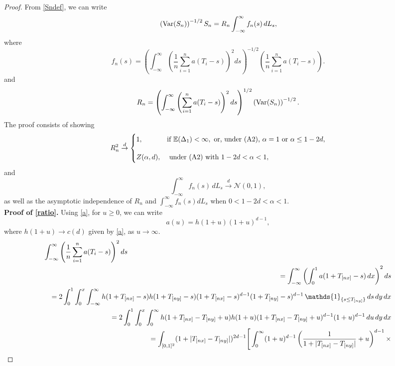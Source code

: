 \documentclass[preprint,12pt]{article}
\newcommand{\ind}[1]{\,\mathds{1}_{\{#1\}}}
\newcommand{\Var}{{\rm Var}}
\begin{document}
\begin{proof} From \eqref{Sndef}, we can write
\begin{eqnarray*}
\left(\Var(S_n)\right)^{-1/2}S_n
=
R_n
\int_{-\infty}^\infty f_n(s)\,dL_s,
\end{eqnarray*}
where
\begin{equation}\label{normalized f_n}
f_n(s)
=
\left(
\int_{-\infty}^\infty
\left(
\frac{1}{n}\sum_{i=1}^n a(T_i-s)
\right)^2ds
\right)^{-1/2}
\left(
\frac{1}{n}\sum_{i=1}^n a(T_i-s)
\right).
\end{equation}
and
$$
R_n
=
\left(
\int_{-\infty}^\infty
\left(\sum_{i=1}^n a(T_i-s)\right)^2ds
\right)^{1/2}
\left(\Var(S_n)\right)^{-1/2}.
$$
The proof consists of showing 
\begin{eqnarray}\label{ratio}
R_n^2\overset{d}{\to}
\begin{cases}
1,
&
\textrm{if } \mathbb{E}(\Delta_1)<\infty,
\textrm{ or, under {\rm(A2)}, } \alpha=1
\textrm{ or } \alpha\le 1-2d,
\\[0.4cm]
Z(\alpha,d),
&
\textrm{ under {\rm(A2)} with } 1-2d<\alpha<1,
\end{cases}
\end{eqnarray}
and
\begin{equation}\label{self normalized}
\int_{-\infty}^\infty f_n(s)\,dL_s
\overset{d}{\longrightarrow}
\mathcal{N}(0,1),
\end{equation}
as well as  the asymptotic independence of 
$R_n$ and $\int_{-\infty}^\infty f_n(s)dL_s$  when $0<1-2d<\alpha<1$.\\
{\bf Proof of \eqref{ratio}.}
Using \eqref{a}, for $u\ge0$,  we can write
$$
a(u)=h(1+u)(1+u)^{d-1},
$$
where $h(1+u)\to c(d)$ given by \eqref{a}, as $u\to\infty$.
\begin{eqnarray}\label{equivalence}
\lefteqn{
\int_{-\infty}^\infty
\left(
\frac{1}{n}\sum_{i=1}^n a(T_i-s)
\right)^2ds
}\nonumber\\
&&=
\int_{-\infty}^\infty
\left(
\int_0^1
a(1+T_{[nx]}-s)\,dx
\right)^2ds
\nonumber\\
&&=
2\int_0^1\int_0^x\int_{-\infty}^\infty
h(1+T_{[nx]}-s)h(1+T_{[ny]}-s)(1+T_{[nx]}-s)^{d-1}
(1+T_{[ny]}-s)^{d-1}
\ind{s\le T_{[ny]}}\,ds\,dy\,dx
\nonumber\\
&&=
2\int_0^1\int_0^x\int_0^\infty h(1+T_{[nx]}-T_{[ny]}+u)h(1+u)
(1+T_{[nx]}-T_{[ny]}+u)^{d-1}
(1+u)^{d-1}\,du\,dy\,dx
\nonumber\\
&&=
\int_{[0,1]^2}(1+|T_{[nx]}-T_{[ny]}|)^{2d-1}\Bigg[
\int_0^\infty
(1+u)^{d-1}
\left(
\frac{1}{1+|T_{[nx]}-T_{[ny]}|}+u
\right)^{d-1}\times\nonumber\\

\end{eqnarray}
\end{proof}
\end{document}
